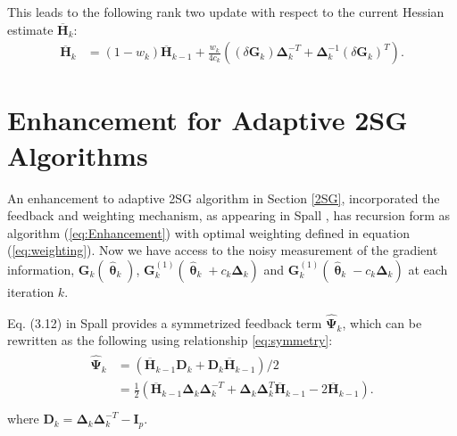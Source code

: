 \documentclass[conference]{IEEEtran}
\newcommand{\bD}{\bm{D}}
\newcommand{\bG}{\bm{G}}
\newcommand{\bI}{\bm{I}}
\newcommand{\bDelta}{\bm{\Delta}}
\newcommand{\oH}{\bm{\overline{H}}}
\newcommand{\hPsi}{\bm{\hat{\Psi}}}
\newcommand{\htheta}{\bm{\hat{\uptheta}}}
\newcommand{\remove}[1]{}
\begin{document}
	This leads to the following rank two update with respect to
	the current Hessian estimate $\oH_k$:
	\begin{align*}
		\oH_k
		&= (1 - w_k) \oH_{k-1} + \frac{w_k}{4c_k} ((\delta\bG_k)\bDelta_k^{-T}+\bDelta_k^{-1}(\delta\bG_k)^{T}).
	\end{align*}
	\remove{
		Above gives a rank-two update from $ \oH_{k-1}^{-1} $ to $ \oH_{k}^{-1} $. Write the sequential recursions for the $ \oH_k^{-1} $ as following:
		\begin{equation} \label{eq:2SGSequentialUpdate}
			\begin{dcases}
				\bm{B}_k^{-1}
				&=\frac{k+1}{k}\oH_{k-1}^{-1}-(\frac{k+1}{k})^2\oH_{k-1}^{-1}(\delta\bG_k)\\
				&~~~\cdot(b_k^{-1}+\frac{k+1}{k}\bDelta_k^{-T}\oH_{k-1}^{-1}(\delta\bG_k)\bDelta_k^{-T}\oH_{k-1}^{-1}\\
				\oH_k^{-1}
				&=\bm{B}_k^{-1}-\bm{B}_k^{-1}\bDelta_k^{-1}\\
				&~~~\cdot(b_k^{-1}+(\delta\bG_k)^{T}\bm{B}_k^{-1}\bDelta_k^{-1})^{-1}(\delta\bG_k)^{T}\bm{B}_k^{-1}
			\end{dcases}
		\end{equation}
		where
		\begin{equation}\label{eq:2SGB}
			\bm{B}_k=\frac{k}{k+1}\oH_{k-1}+b_k(\delta\bG_k)\bDelta_k^{-T}
		\end{equation}
	}

	
	
	\section{Enhancement for Adaptive 2SG Algorithms} \label{Enhanced 2SG}
	An enhancement to adaptive 2SG algorithm in Section \ref{2SG}, incorporated the feedback and weighting mechanism, as appearing in Spall \cite{Spall2009}, has recursion form as algorithm (\ref{eq:Enhancement}) with optimal weighting defined in equation (\ref{eq:weighting}). Now we have access to the noisy measurement of the gradient information, $\bG_k(\htheta_k)$, $\bG_k^{(1)}(\htheta_k+ c_k\bDelta_k)$ and $\bG_k^{(1)}(\htheta_k- c_k\bDelta_k)$ at each iteration $k$.
	
	Eq. (3.12) in Spall \cite{Spall2009} provides a symmetrized feedback term $ \hPsi_k $, which can be rewritten as the following using relationship \ref{eq:symmetry}:
	\begin{align}
		\begin{split}
			\hPsi_k &=(\oH_{k-1}\bD_k+\bD_k\oH_{k-1})/2\\
			&=\frac{1}{2}\left( \oH_{k-1}\bDelta_k\bDelta_k^{-T}+\bDelta_k\bDelta_k^{T}\oH_{k-1}-2\oH_{k-1} \right).\\
		\end{split}
	\end{align}
	where $ \bD_k=\bDelta_k\bDelta_k^{-T}-\bI_p$.
	
\end{document}
